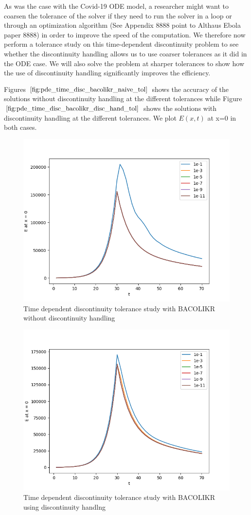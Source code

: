 \documentclass{article}
\begin{document}
As was the case with the Covid-19 ODE model, a researcher might want to coarsen the tolerance of the solver if they need to run the solver in a loop or through an optimization algorithm (See Appendix 8888 point to Althaus Ebola paper 8888) in order to improve the speed of the computation. We therefore now perform a tolerance study on this time-dependent discontinuity problem to see whether the discontinuity handling allows us to use coarser tolerances as it did in the ODE case. We will also solve the problem at sharper tolerances to show how the use of discontinuity handling significantly improves the efficiency.

Figures $\ref{fig:pde_time_disc_bacolikr_naive_tol}$ shows the accuracy of the solutions without discontinuity handling at the different tolerances while Figure $\ref{fig:pde_time_disc_bacolikr_disc_hand_tol}$ shows the solutions with discontinuity handling at the different tolerances. We plot $E(x, t)$ at x=0 in both cases. 

\begin{figure}[H]
\centering
\includegraphics[width=0.7\linewidth]{./figures/pde_time_disc_bacolikr_naive_tol}
\caption{Time dependent discontinuity tolerance study with BACOLIKR without discontinuity handling}
\label{fig:pde_time_disc_bacolikr_naive_tol}
\end{figure}

\begin{figure}[H]
\centering
\includegraphics[width=0.7\linewidth]{./figures/pde_time_disc_bacolikr_disc_hand_tol}
\caption{Time dependent discontinuity tolerance study with BACOLIKR using discontinuity handlng}
\label{fig:pde_time_disc_bacolikr_disc_hand_tol}
\end{figure}
\end{document}
